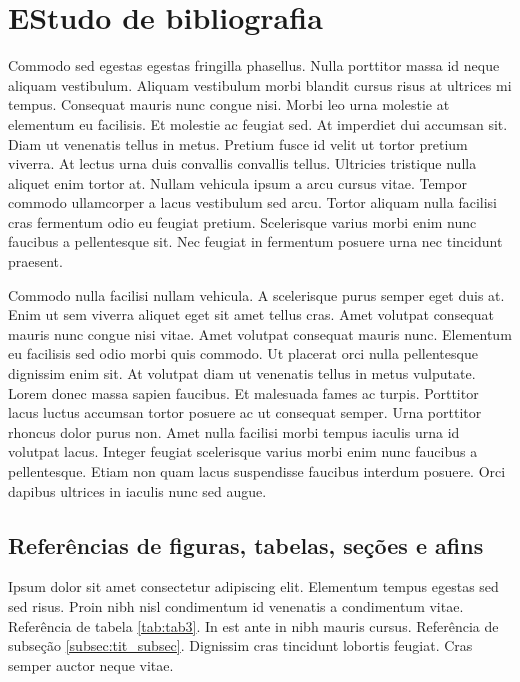 \documentclass[12pt]{article}
\begin{document}
				
				
	\newpage
	
	\section{EStudo de bibliografia}
		Commodo sed egestas egestas fringilla phasellus. Nulla porttitor massa id neque aliquam vestibulum. Aliquam vestibulum morbi blandit cursus risus at ultrices mi tempus. Consequat mauris nunc congue nisi. Morbi leo urna molestie at elementum eu facilisis. Et molestie ac feugiat sed. At imperdiet dui accumsan sit. Diam ut venenatis tellus in metus. Pretium fusce id velit ut tortor pretium viverra. At lectus urna duis convallis convallis tellus. Ultricies tristique nulla aliquet enim tortor at. Nullam vehicula ipsum a arcu cursus vitae. Tempor commodo ullamcorper a lacus vestibulum sed arcu. Tortor aliquam nulla facilisi cras fermentum odio eu feugiat pretium. Scelerisque varius morbi enim nunc faucibus a pellentesque sit. Nec feugiat in fermentum posuere urna nec tincidunt praesent.\textbf{\citeauthor{agr_machines}}
		
		Commodo nulla facilisi nullam vehicula. A scelerisque purus semper eget duis at. Enim ut sem viverra aliquet eget sit amet tellus cras. Amet volutpat consequat mauris nunc congue nisi vitae. Amet volutpat consequat mauris nunc. Elementum eu facilisis sed odio morbi quis commodo.\textbf{\cite{practical_eletronics}} Ut placerat orci nulla pellentesque dignissim enim sit. At volutpat diam ut venenatis tellus in metus vulputate. Lorem donec massa sapien faucibus. Et malesuada fames ac turpis. Porttitor lacus luctus accumsan tortor posuere ac ut consequat semper. Urna porttitor rhoncus dolor purus non. Amet nulla facilisi morbi tempus iaculis urna id volutpat lacus. Integer feugiat scelerisque varius morbi enim nunc faucibus a pellentesque. Etiam non quam lacus suspendisse faucibus interdum posuere. Orci dapibus ultrices in iaculis nunc sed augue.
		
		\subsection{Referências de figuras, tabelas, seções e afins}
			Ipsum dolor sit amet consectetur adipiscing elit. Elementum tempus egestas sed sed risus. Proin nibh nisl condimentum id venenatis a condimentum vitae. Referência de tabela \ref{tab:tab3}. In est ante in nibh mauris cursus. Referência de subseção \ref{subsec:tit_subsec}. Dignissim cras tincidunt lobortis feugiat. Cras semper auctor neque vitae. 
			
\end{document}
